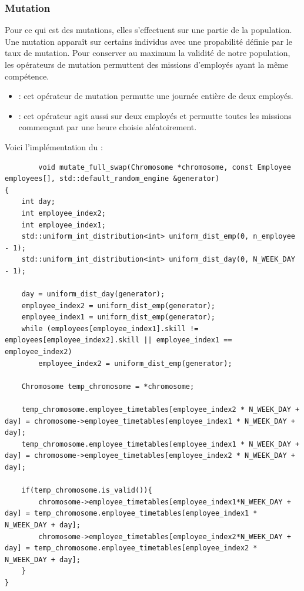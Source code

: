 \documentclass{article}
\begin{document}
        \subsubsection{Mutation}
        Pour ce qui est des mutations, elles s'effectuent sur une partie de la population. Une mutation apparaît sur certains individus avec une propabilité définie par le taux de mutation. Pour conserver au maximum la validité de notre population, les opérateurs de mutation permuttent des missions d'employés ayant la même compétence.
        \begin{itemize}  
        \item {} : cet opérateur de mutation permutte une journée entière de deux employés.
        \item {} : cet opérateur agit aussi sur deux employés et permutte toutes les missions commençant par une heure choisie aléatoirement.
        \end{itemize}
        Voici l'implémentation du :
        \begin{lstlisting}
        void mutate_full_swap(Chromosome *chromosome, const Employee employees[], std::default_random_engine &generator)
{
    int day;
    int employee_index2;
    int employee_index1;
    std::uniform_int_distribution<int> uniform_dist_emp(0, n_employee - 1);
    std::uniform_int_distribution<int> uniform_dist_day(0, N_WEEK_DAY - 1);

    day = uniform_dist_day(generator);
    employee_index2 = uniform_dist_emp(generator);
    employee_index1 = uniform_dist_emp(generator);
    while (employees[employee_index1].skill != employees[employee_index2].skill || employee_index1 == employee_index2)
        employee_index2 = uniform_dist_emp(generator);

    Chromosome temp_chromosome = *chromosome;

    temp_chromosome.employee_timetables[employee_index2 * N_WEEK_DAY + day] = chromosome->employee_timetables[employee_index1 * N_WEEK_DAY + day];
    temp_chromosome.employee_timetables[employee_index1 * N_WEEK_DAY + day] = chromosome->employee_timetables[employee_index2 * N_WEEK_DAY + day];

    if(temp_chromosome.is_valid()){
        chromosome->employee_timetables[employee_index1*N_WEEK_DAY + day] = temp_chromosome.employee_timetables[employee_index1 * N_WEEK_DAY + day];
        chromosome->employee_timetables[employee_index2*N_WEEK_DAY + day] = temp_chromosome.employee_timetables[employee_index2 * N_WEEK_DAY + day];
    } 
}
        \end{lstlisting}
    
\end{document}
